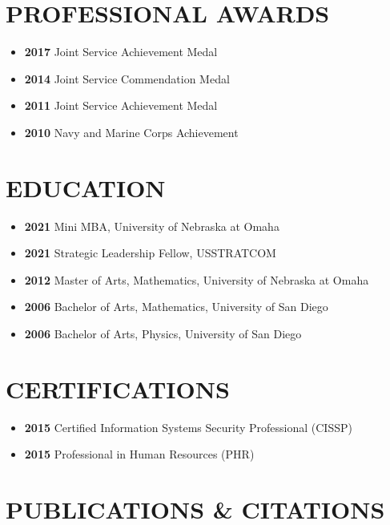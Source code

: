 \documentclass[10pt]{article}
\def\tightlist{}
\begin{document}
\hypertarget{professional-awards}{%
\section{PROFESSIONAL AWARDS}\label{professional-awards}}

\begin{itemize}
\tightlist
\item
  \textbf{2017} Joint Service Achievement Medal
\item
  \textbf{2014} Joint Service Commendation Medal
\item
  \textbf{2011} Joint Service Achievement Medal
\item
  \textbf{2010} Navy and Marine Corps Achievement
\end{itemize}

\hypertarget{education}{%
\section{EDUCATION}\label{education}}

\begin{itemize}
\tightlist
\item
  \textbf{2021} Mini MBA, University of Nebraska at Omaha
\item
  \textbf{2021} Strategic Leadership Fellow, USSTRATCOM
\item
  \textbf{2012} Master of Arts, Mathematics, University of Nebraska at
  Omaha
\item
  \textbf{2006} Bachelor of Arts, Mathematics, University of San Diego
\item
  \textbf{2006} Bachelor of Arts, Physics, University of San Diego
\end{itemize}

\hypertarget{certifications}{%
\section{CERTIFICATIONS}\label{certifications}}

\begin{itemize}
\tightlist
\item
  \textbf{2015} Certified Information Systems Security Professional
  (CISSP)
\item
  \textbf{2015} Professional in Human Resources (PHR)
\end{itemize}

\hypertarget{publications-citations}{%
\section{PUBLICATIONS \& CITATIONS}\label{publications-citations}}
\end{document}
